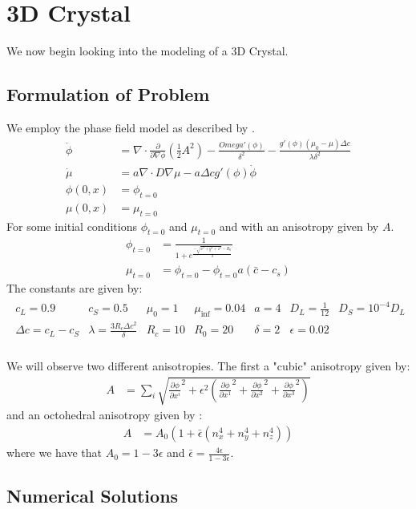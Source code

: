 \section{3D Crystal}
We now begin looking into the modeling of a 3D Crystal.
\subsection{Formulation of Problem}
We employ the phase field model as described by \cite{Bollada2023}.
\begin{align*}
    \dot \phi &= \nabla \cdot \frac{\partial}{\partial \nabla \phi}(\frac12 A^2)-\frac{Omega'(\phi)}{\delta^2} - \frac{g'(\phi)(\mu_0-\mu)\Delta c}{\lambda \delta^2}\\
    \dot \mu &= a\nabla \cdot D \nabla \mu - a \Delta c g'(\phi)\dot \phi\\
    \phi(0,x) &= \phi_{t=0}\\
    \mu(0,x) &= \mu_{t=0}
\end{align*}
For some initial conditions $\phi_{t=0}$ and $\mu_{t=0}$ and with an anisotropy given by $A$.
\begin{align*}
    \phi_{t=0} &= \frac{1}{1+e^{\frac{-\sqrt{x^2 + y^2 + z^2}-R_0}{\delta}}}\\
    \mu_{t=0} &= \phi_{t=0} - \phi_{t=0}a(\bar c - c_s)
\end{align*}
The constants are given by:
\begin{align*}
    \begin{matrix}
    c_L = 0.9 & c_S = 0.5 & \mu_0 = 1 & \mu_{\inf} = 0.04 & a = 4 & D_L= \frac{1}{12} & D_S = 10^{-4}D_L\\
    \Delta c = c_L - c_S & \lambda = \frac{3R_c\Delta c^2}{\delta} & R_c = 10 & R_0 = 20 & \delta = 2 & \epsilon = 0.02\\
    \end{matrix}
\end{align*}

We will observe two different anisotropies.
The first a "cubic" anisotropy given by:
\begin{align*}
    A &= \sum_i \sqrt{\frac{\partial \phi}{\partial x^i}^2 + \epsilon^2(\frac{\partial \phi}{\partial x^1}^2 + \frac{\partial \phi}{\partial x^2}^2 + \frac{\partial \phi}{\partial x^3}^2)}
\end{align*}
and an octohedral anisotropy given by \cite{Bollada2015}:
\begin{align*}
    A &= A_0 (1 + \bar \epsilon(n^4_x+n^4_y+n^4_z))
\end{align*}
where we have that $A_0 =1 -3\epsilon$ and $\bar \epsilon = \frac{4\epsilon}{1-3\epsilon}$.


\subsection{Numerical Solutions}

